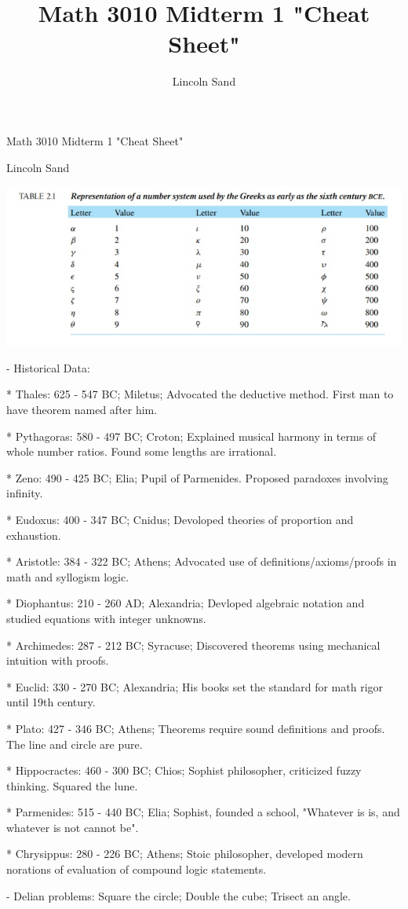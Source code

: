 \documentclass{article}
\title{Math 3010 Midterm 1 "Cheat Sheet"}
\author{Lincoln Sand}
\begin{document}
Math 3010 Midterm 1 "Cheat Sheet"

Lincoln Sand

\includegraphics[width=\linewidth]{greek_numbers}

- Historical Data:

* Thales: 625 - 547 BC; Miletus; Advocated the deductive method. First man to have theorem named after him.

* Pythagoras: 580 - 497 BC; Croton; Explained musical harmony in terms of whole number ratios. Found some lengths are irrational.

* Zeno: 490 - 425 BC; Elia; Pupil of Parmenides. Proposed paradoxes involving infinity.

* Eudoxus: 400 - 347 BC; Cnidus; Devoloped theories of proportion and exhaustion.

* Aristotle: 384 - 322 BC; Athens; Advocated use of definitions/axioms/proofs in math and syllogism logic.

* Diophantus: 210 - 260 AD; Alexandria; Devloped algebraic notation and studied equations with integer unknowns.

* Archimedes: 287 - 212 BC; Syracuse; Discovered theorems using mechanical intuition with proofs.

* Euclid: 330 - 270 BC; Alexandria; His books set the standard for math rigor until 19th century.

* Plato: 427 - 346 BC; Athens; Theorems require sound definitions and proofs. The line and circle are pure.

* Hippocractes: 460 - 300 BC; Chios; Sophist philosopher, criticized fuzzy thinking. Squared the lune.

* Parmenides: 515 - 440 BC; Elia; Sophist, founded a school, "Whatever is is, and whatever is not cannot be".

* Chrysippus: 280 - 226 BC; Athens; Stoic philosopher, developed modern norations of evaluation of compound logic statements.

- Delian problems: Square the circle; Double the cube; Trisect an angle.
\end{document}
